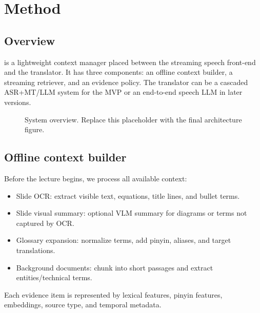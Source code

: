 \section{Method}

\subsection{Overview}

\policyname{} is a lightweight context manager placed between the streaming speech front-end and the translator.  It has three components: an offline context builder, a streaming retriever, and an evidence policy.  The translator can be a cascaded ASR+MT/LLM system for the MVP or an end-to-end speech LLM in later versions.

\begin{figure}[t]
\centering
{}
\caption{System overview.  Replace this placeholder with the final architecture figure.}
\label{fig:overview}
\end{figure}

\subsection{Offline context builder}

Before the lecture begins, we process all available context:
\begin{itemize}[leftmargin=*]
    \item Slide OCR: extract visible text, equations, title lines, and bullet terms.
    \item Slide visual summary: optional VLM summary for diagrams or terms not captured by OCR.
    \item Glossary expansion: normalize terms, add pinyin, aliases, and target translations.
    \item Background documents: chunk into short passages and extract entities/technical terms.
\end{itemize}
Each evidence item is represented by lexical features, pinyin features, embeddings, source type, and temporal metadata.

